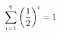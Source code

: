 \documentclass[preview]{standalone}
\begin{document}
\begin{align*}
\sum_{i=1}^{ 6 } \left({ 1 } \over {2} \right)^i = { 1 }
\end{align*}
\end{document}
